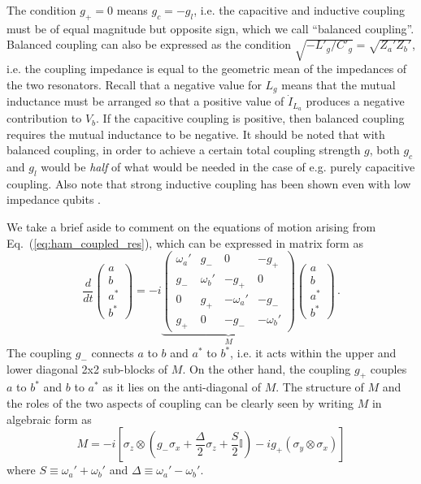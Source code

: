 The condition $g_+ = 0$ means $g_c = -g_l$, i.e. the capacitive and inductive coupling must be of equal magnitude but opposite sign, which we call ``balanced coupling''.
Balanced coupling can also be expressed as the condition $\sqrt{-L'_g / C'_g} = \sqrt{Z_a' Z_b'}$, i.e. the coupling impedance is equal to the geometric mean of the impedances of the two resonators.
Recall that a negative value for $L_g$ means that the mutual inductance must be arranged so that a positive value of $\dot{I}_{L_a}$ produces a negative contribution to $V_b$.
If the capacitive coupling is positive, then balanced coupling requires the mutual inductance to be negative.
It should be noted that with balanced coupling, in order to achieve a certain total coupling strength $g$, both $g_c$ and $g_l$ would be \emph{half} of what would be needed in the case of e.g. purely capacitive coupling.
Also note that strong inductive coupling has been shown even with low impedance qubits \cite{Neill:gmon:2014}.

\label{sec:equations_of_motion}

We take a brief aside to comment on the equations of motion arising from Eq.~(\ref{eq:ham_coupled_res}), which can be expressed in matrix form as
\begin{equation}
  \frac{d}{dt}
  \left( \begin{array}{c} a \\ b \\ a^* \\ b^* \end{array} \right)
  = -i \underbrace{\left( \begin{array}{cccc}
    \omega_a' & g_- & 0 & -g_+ \\
    g_- & \omega_b' & -g_+ & 0 \\
    0 & g_+ & -\omega_a' & -g _- \\
    g_+ & 0 & -g_- & -\omega_b'
  \end{array} \right)}_M
  \left( \begin{array}{c} a \\ b \\ a^* \\ b^* \end{array} \right) \, .
\end{equation}
The coupling $g_-$ connects $a$ to $b$ and $a^*$ to $b^*$, i.e. it acts within the upper and lower diagonal 2x2 sub-blocks of $M$.
On the other hand, the coupling $g_+$ couples $a$ to $b^*$ and $b$ to $a^*$ as it lies on the anti-diagonal of $M$.
The structure of $M$ and the roles of the two aspects of coupling can be clearly seen by writing $M$ in algebraic form as
\begin{equation}
  M = -i \left[
    \sigma_z \otimes
      \left(
        g_- \sigma_x + \frac{\Delta}{2} \sigma_z + \frac{S}{2} \mathbb{I}
      \right)
    -i g_+ (\sigma_y \otimes \sigma_x)
  \right]
\end{equation}
where $S \equiv \omega_a' + \omega_b'$ and $\Delta \equiv \omega_a' - \omega_b'$.

